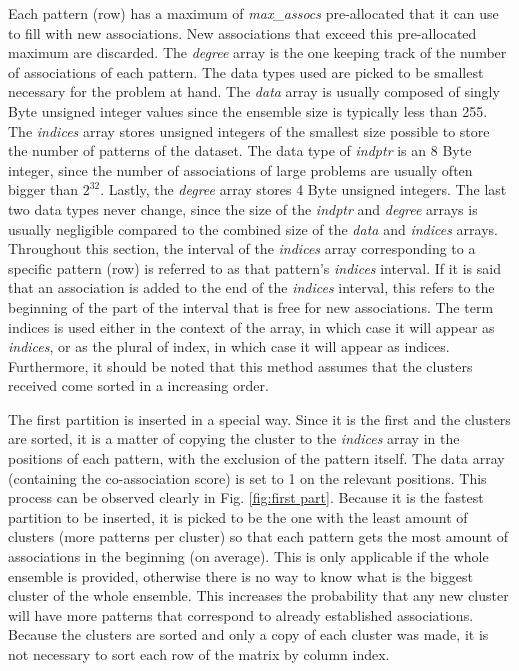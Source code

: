 Each pattern (row) has a maximum of \emph{max\_assocs} pre-allocated that it can use to fill with new associations.
New associations that exceed this pre-allocated maximum are discarded.
The \emph{degree} array is the one keeping track of the number of associations of each pattern.
The data types used are picked to be smallest necessary for the problem at hand.
The \emph{data} array is usually composed of singly Byte unsigned integer values since the ensemble size is typically less than 255.
The \emph{indices} array stores unsigned integers of the smallest size possible to store the number of patterns of the dataset.
The data type of \emph{indptr} is an 8 Byte integer, since the number of associations of large problems are usually often bigger than $2^{32}$.
Lastly, the \emph{degree} array stores 4 Byte unsigned integers.
The last two data types never change, since the size of the \emph{indptr} and \emph{degree} arrays is usually negligible compared to the combined size of the \emph{data} and \emph{indices} arrays.
Throughout this section, the interval of the \emph{indices} array corresponding to a specific pattern (row) is referred to as that pattern's \emph{indices} interval.
If it is said that an association is added to the end of the \emph{indices} interval, this refers to the beginning of the part of the interval that is free for new associations.
The term indices is used either in the context of the array, in which case it will appear as \emph{indices}, or as the plural of index, in which case it will appear as indices.
Furthermore, it should be noted that this method assumes that the clusters received come sorted in a increasing order.

The first partition is inserted in a special way.
Since it is the first and the clusters are sorted, it is a matter of copying the cluster to the \emph{indices} array in the positions of each pattern, with the exclusion of the pattern itself.
The data array (containing the co-association score) is set to 1 on the relevant positions.
This process can be observed clearly in Fig. \ref{fig:first part}.
Because it is the fastest partition to be inserted, it is picked to be the one with the least amount of clusters (more patterns per cluster) so that each pattern gets the most amount of associations in the beginning (on average).
This is only applicable if the whole ensemble is provided, otherwise there is no way to know what is the biggest cluster of the whole ensemble.
This increases the probability that any new cluster will have more patterns that correspond to already established associations.
Because the clusters are sorted and only a copy of each cluster was made, it is not necessary to sort each row of the matrix by column index.

